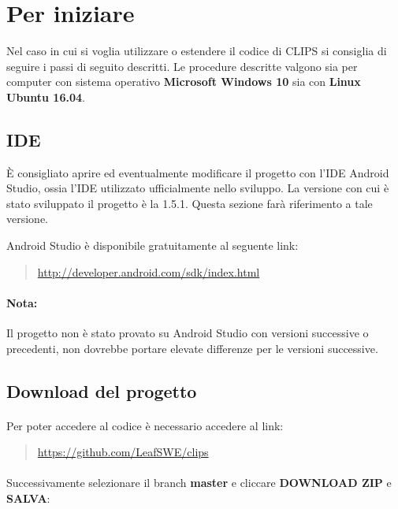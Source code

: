 \documentclass[../ManualeSviluppatore.tex]{subfiles}
\begin{document}
\section{Per iniziare}

	Nel caso in cui si voglia utilizzare o estendere il codice di CLIPS si consiglia di seguire i passi di seguito descritti. Le procedure descritte valgono sia per computer con sistema operativo \textbf{Microsoft Windows 10} sia con \textbf{Linux Ubuntu 16.04}.

	\subsection{IDE}
		È consigliato aprire ed eventualmente modificare il progetto con l'IDE \gls{Android Studio}, ossia l'IDE utilizzato ufficialmente nello sviluppo. La versione con cui è stato sviluppato il progetto è la 1.5.1. Questa sezione farà riferimento a tale versione.
		
	 \gls{Android Studio} è disponibile gratuitamente al seguente link:
		\begin{quote}
			\centering
			\url{http://developer.android.com/sdk/index.html}
		\end{quote}
		
		\paragraph*{Nota:} 
			Il progetto non è stato provato su \gls{Android Studio} con versioni successive o precedenti, non dovrebbe portare elevate differenze per le versioni successive.
		
		
		
		
	\subsection{Download del progetto}
		\paragraph*{}
			Per poter accedere al codice è necessario accedere al link:
		\begin{quote}
			\centering
			\url{https://github.com/LeafSWE/clips}
		\end{quote}

		\paragraph*{}
			Successivamente selezionare il branch \textbf{master} e cliccare \textbf{DOWNLOAD ZIP} e \textbf{SALVA}:
			
\end{document}
